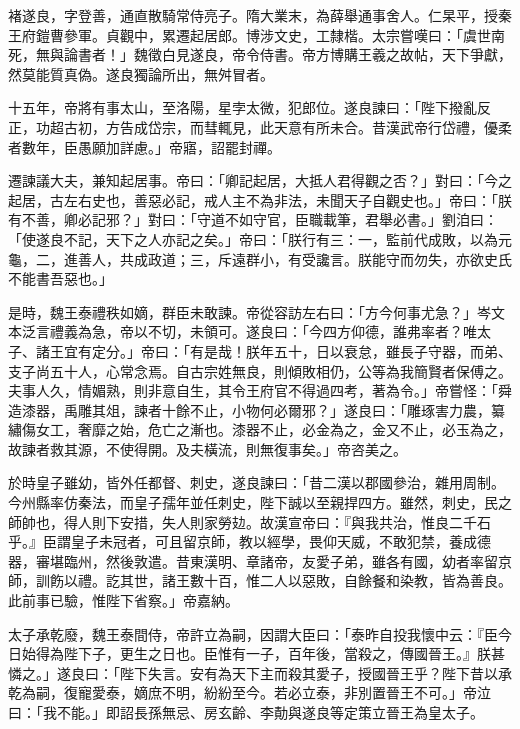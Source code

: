 \begin{pinyinscope}
 褚遂良，字登善，通直散騎常侍亮子。隋大業末，為薛舉通事舍人。仁杲平，授秦王府鎧曹參軍。貞觀中，累遷起居郎。博涉文史，工隸楷。太宗嘗嘆曰：「虞世南死，無與論書者！」魏徵白見遂良，帝令侍書。帝方博購王羲之故帖，天下爭獻，然莫能質真偽。遂良獨論所出，無舛冒者。



 十五年，帝將有事太山，至洛陽，星孛太微，犯郎位。遂良諫曰：「陛下撥亂反正，功超古初，方告成岱宗，而彗輒見，此天意有所未合。昔漢武帝行岱禮，優柔者數年，臣愚願加詳慮。」帝寤，詔罷封禪。



 遷諫議大夫，兼知起居事。帝曰：「卿記起居，大抵人君得觀之否？」對曰：「今之起居，古左右史也，善惡必記，戒人主不為非法，未聞天子自觀史也。」帝曰：「朕有不善，卿必記邪？」對曰：「守道不如守官，臣職載筆，君舉必書。」劉洎曰：「使遂良不記，天下之人亦記之矣。」帝曰：「朕行有三：一，監前代成敗，以為元龜，二，進善人，共成政道；三，斥遠群小，有受讒言。朕能守而勿失，亦欲史氏不能書吾惡也。」



 是時，魏王泰禮秩如嫡，群臣未敢諫。帝從容訪左右曰：「方今何事尤急？」岑文本泛言禮義為急，帝以不切，未領可。遂良曰：「今四方仰德，誰弗率者？唯太子、諸王宜有定分。」帝曰：「有是哉！朕年五十，日以衰怠，雖長子守器，而弟、支子尚五十人，心常念焉。自古宗姓無良，則傾敗相仍，公等為我簡賢者保傅之。夫事人久，情媚熟，則非意自生，其令王府官不得過四考，著為令。」帝嘗怪：「舜造漆器，禹雕其俎，諫者十餘不止，小物何必爾邪？」遂良曰：「雕琢害力農，纂繡傷女工，奢靡之始，危亡之漸也。漆器不止，必金為之，金又不止，必玉為之，故諫者救其源，不使得開。及夫橫流，則無復事矣。」帝咨美之。



 於時皇子雖幼，皆外任都督、刺史，遂良諫曰：「昔二漢以郡國參治，雜用周制。今州縣率仿秦法，而皇子孺年並任刺史，陛下誠以至親捍四方。雖然，刺史，民之師帥也，得人則下安措，失人則家勞攰。故漢宣帝曰：『與我共治，惟良二千石乎。』臣謂皇子未冠者，可且留京師，教以經學，畏仰天威，不敢犯禁，養成德器，審堪臨州，然後敦遣。昔東漢明、章諸帝，友愛子弟，雖各有國，幼者率留京師，訓飭以禮。訖其世，諸王數十百，惟二人以惡敗，自餘餐和染教，皆為善良。此前事已驗，惟陛下省察。」帝嘉納。



 太子承乾廢，魏王泰間侍，帝許立為嗣，因謂大臣曰：「泰昨自投我懷中云：『臣今日始得為陛下子，更生之日也。臣惟有一子，百年後，當殺之，傳國晉王。』朕甚憐之。」遂良曰：「陛下失言。安有為天下主而殺其愛子，授國晉王乎？陛下昔以承乾為嗣，復寵愛泰，嫡庶不明，紛紛至今。若必立泰，非別置晉王不可。」帝泣曰：「我不能。」即詔長孫無忌、房玄齡、李勣與遂良等定策立晉王為皇太子。




\end{pinyinscope}
